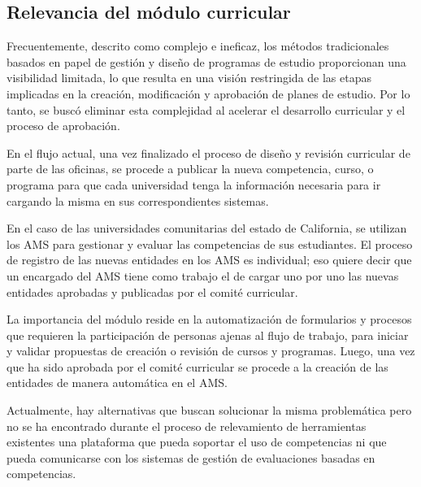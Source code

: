 \subsection{Relevancia del módulo curricular}
Frecuentemente, descrito como complejo e ineficaz, los métodos tradicionales basados en papel de gestión y diseño de programas de estudio proporcionan una visibilidad limitada, lo que resulta en una visión restringida de las etapas implicadas en la creación, modificación y aprobación de planes de estudio. Por lo tanto, se buscó eliminar esta complejidad al acelerar el desarrollo curricular y el proceso de aprobación.

En el flujo actual, una vez finalizado el proceso de diseño y revisión curricular de parte de las oficinas, se procede a publicar la nueva competencia, curso, o programa para que cada universidad tenga la información necesaria para ir cargando la misma en sus correspondientes sistemas. 

En el caso de las universidades comunitarias del estado de California, se utilizan los AMS para gestionar y evaluar las competencias de sus estudiantes. El proceso de registro de las nuevas entidades en los AMS es individual; eso quiere decir que un encargado del AMS tiene como trabajo el de cargar uno por uno las nuevas entidades aprobadas y publicadas por el comité curricular.

La importancia del módulo reside en la automatización de formularios y procesos que requieren la participación de personas ajenas al flujo de trabajo, para iniciar y validar propuestas de creación o revisión de cursos y programas. Luego, una vez que ha sido aprobada por el comité curricular se procede a la creación de las entidades de manera automática en el AMS.

Actualmente, hay alternativas que buscan solucionar la misma problemática pero no se ha encontrado durante el proceso de relevamiento de herramientas existentes una plataforma que pueda soportar el uso de competencias ni que pueda comunicarse con los sistemas de gestión de evaluaciones basadas en competencias.